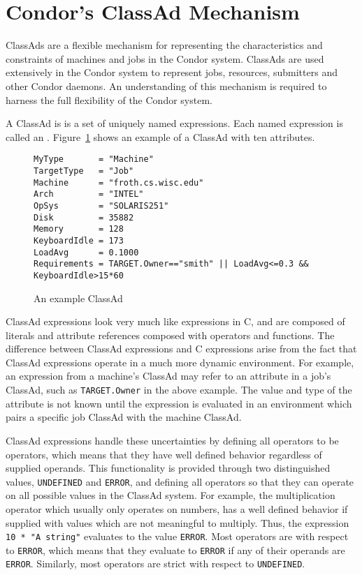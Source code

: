 \section{\label{classad-reference}
Condor's ClassAd Mechanism}
\label{sec:classadref}

ClassAds are a flexible mechanism for representing the characteristics and
constraints of machines and jobs in the Condor system.  ClassAds are used
extensively in the Condor system to represent jobs, resources, submitters
and other Condor daemons.  An understanding of this mechanism is required
to harness the full flexibility of the Condor system.

A ClassAd is is a set of uniquely named expressions.  Each named expression
is called an .  Figure~\ref{ClassAd:example} shows an example 
of a ClassAd with ten attributes.

\begin{figure}[hbt]
\footnotesize
\begin{verbatim}
MyType       = "Machine"
TargetType   = "Job"
Machine      = "froth.cs.wisc.edu"
Arch         = "INTEL"
OpSys        = "SOLARIS251"
Disk         = 35882
Memory       = 128
KeyboardIdle = 173
LoadAvg      = 0.1000
Requirements = TARGET.Owner=="smith" || LoadAvg<=0.3 && KeyboardIdle>15*60
\end{verbatim}
\normalsize
\caption{\label{ClassAd:example}An example ClassAd}
\end{figure}

ClassAd expressions look very much like expressions in C, and are composed
of literals and attribute references composed with operators 
and functions.
The difference
between ClassAd expressions and C expressions arise from the fact that ClassAd
expressions operate in a much more dynamic environment.  For example, an
expression from a machine's ClassAd may refer to an attribute in a job's 
ClassAd, such as \verb+TARGET.Owner+ in the above example.  The value and type 
of the attribute is not known until the expression is evaluated in an 
environment which pairs a specific job ClassAd with the machine ClassAd.

ClassAd expressions handle these uncertainties by defining all operators
to be  operators, which means that they have well defined
behavior regardless of supplied operands.  This functionality is provided
through two distinguished values, \texttt{UNDEFINED} and \texttt{ERROR},
and defining all operators so that they can operate on all possible values
in the ClassAd system.  For example, the multiplication operator which usually
only operates on numbers, has a well defined behavior if supplied with values
which are not meaningful to multiply.  Thus, the expression 
\verb+10 * "A string"+ evaluates to the value \texttt{ERROR}.  Most operators
are  with respect to \texttt{ERROR}, which means that they evaluate
to \texttt{ERROR} if any of their operands are \texttt{ERROR}.  Similarly,
most operators are strict with respect to \texttt{UNDEFINED}.

